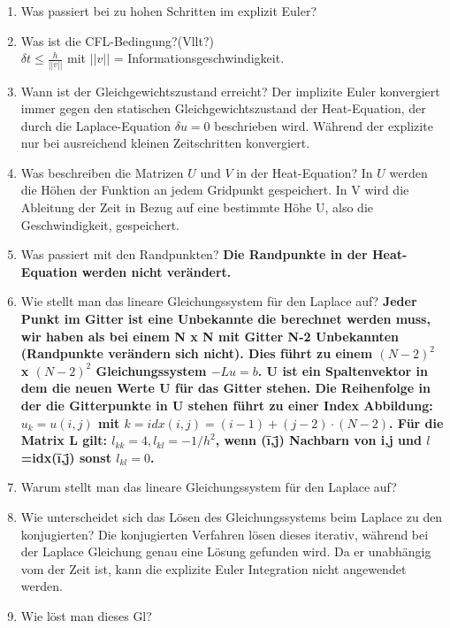 \documentclass[10pt,a4paper,titlepage]{article}
\begin{document}
\begin{enumerate}[resume=b]
	\item Was passiert bei zu hohen Schritten im explizit Euler?
	\item Was ist die CFL-Bedingung?(Vllt?)\\
		$\delta t \le \frac{h}{||v||}$ mit $||v||$ = Informationsgeschwindigkeit.
	\item Wann ist der Gleichgewichtszustand erreicht?\newline
	Der implizite Euler konvergiert immer gegen den statischen Gleichgewichtszustand der Heat-Equation, der durch die Laplace-Equation $\delta u=0$ beschrieben wird. Während der explizite nur bei ausreichend kleinen Zeitschritten konvergiert. 	
	\item Was beschreiben die Matrizen $U$ und $V$ in der Heat-Equation? \newline 
	In $U$ werden die Höhen der Funktion an jedem Gridpunkt gespeichert. In V wird die Ableitung der Zeit in Bezug auf eine bestimmte Höhe U, also die Geschwindigkeit, gespeichert. 
	\item Was passiert mit den Randpunkten? \newline
	\textbf{Die Randpunkte in der Heat-Equation werden nicht verändert.}
	\item Wie stellt man das lineare Gleichungssystem für den Laplace auf? \newline
	\textbf{Jeder Punkt im Gitter ist eine Unbekannte die berechnet werden muss, wir haben als bei einem N x N mit Gitter N-2 Unbekannten (Randpunkte verändern sich nicht). Dies führt zu einem $(N-2)^2$ x $(N-2)^2$ Gleichungssystem $-Lu=b$.
		U ist ein Spaltenvektor in dem die neuen Werte U für das Gitter stehen. Die Reihenfolge in der die Gitterpunkte in U stehen führt zu einer Index Abbildung:$u_k=u(i,j)$ mit $k=idx(i,j)=(i-1)+(j-2)\cdot(N-2)$.
		Für die Matrix L gilt: $l_{kk}=4, l_{kl}=-1/h^2$, wenn (\={i},\={j}) Nachbarn von i,j und $l$=idx(\={i},\={j}) sonst $l_{kl}=0$.
	}
	\item Warum stellt man das lineare Gleichungssystem für den Laplace auf?
	\item Wie unterscheidet sich das Lösen des Gleichungssystems beim Laplace zu den konjugierten? \newline
	Die konjugierten Verfahren lösen dieses iterativ, während bei der Laplace Gleichung genau eine Lösung gefunden wird. Da er unabhängig vom der Zeit ist, kann die explizite Euler Integration nicht angewendet werden. 
	\item Wie löst man dieses Gl?\newline

\end{enumerate}
\end{document}

